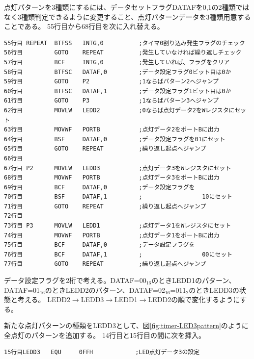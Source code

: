 \documentclass[a4paper,12pt]{ujarticle}
\begin{document}
      点灯パターンを3種類にするには、データセットフラグDATAFを0,1の2種類ではなく3種類判定できるように変更すること、点灯パターンデータを3種類用意することである。
55行目から68行目を次に入れ替える。
      \begin{lstlisting}[basicstyle=\ttfamily\footnotesize, frame=single]
55行目 REPEAT  BTFSS   INTG,0          ;タイマ0割り込み発生フラグのチェック
56行目         GOTO    REPEAT          ;発生していなければ繰り返しチェック
57行目         BCF     INTG,0          ;発生していれば、フラグをクリア
58行目         BTFSC   DATAF,0         ;データ設定フラグ0ビット目は0か
59行目         GOTO    P2              ;1ならばパターン2へジャンプ
60行目         BTFSC   DATAF,1         ;データ設定フラグ1ビット目は0か
61行目         GOTO    P3              ;1ならばパターン3へジャンプ
62行目         MOVLW   LEDD2           ;0ならば点灯データ2をWレジスタにセット
63行目         MOVWF   PORTB           ;点灯データ2をポートBに出力
64行目         BSF     DATAF,0         ;データ設定フラグを01にセット
65行目         GOTO    REPEAT          ;繰り返し起点へジャンプ
66行目
67行目 P2      MOVLW   LEDD3           ;点灯データ3をWレジスタにセット
68行目         MOVWF   PORTB           ;点灯データ3をポートBに出力
69行目         BCF     DATAF,0         ;データ設定フラグを
70行目         BSF     DATAF,1         ;                 10にセット
71行目         GOTO    REPEAT          ;繰り返し起点へジャンプ
72行目
73行目 P3      MOVLW   LEDD1           ;点灯データ1をWレジスタにセット
74行目         MOVWF   PORTB           ;点灯データ1をポートBに出力
75行目         BCF     DATAF,0         ;データ設定フラグを
76行目         BCF     DATAF,1         ;                 00にセット
77行目         GOTO    REPEAT          ;繰り返し起点へジャンプ
      \end{lstlisting}

       データ設定フラグを2桁で考える。DATAF=00$_{16}$のときLEDD1のパターン、DATAF=01$_{16}$のときLEDD2のパターン、DATAF=02$_{16}$=011$_2$のときLEDD3の状態と考える。
       LEDD2$\to$LEDD3$\to$LEDD1$\to$LEDD2の順で変化するようにする。

       新たな点灯パターンの種類をLEDD3として、図\ref{fig:timer-LED3pattern}のように全点灯のパターンを追加する。
14行目と15行目の間に次を挿入。
      \begin{lstlisting}[basicstyle=\ttfamily\footnotesize, frame=single]
15行目LEDD3   EQU     0FFH            ;LED点灯データ3の設定
      \end{lstlisting}
\end{document}
